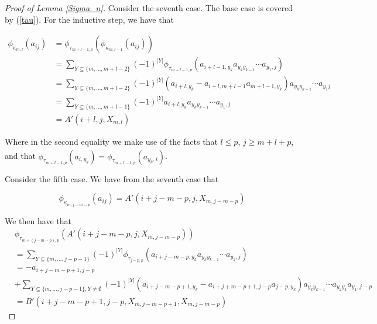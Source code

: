 \documentclass[11pt]{amsart}
\def\t{{\tau}}
\def\k{{\kappa}}
\theoremstyle{definition}
\begin{document}
\begin{proof} [Proof of Lemma \ref{Sigma_n}]
Consider the seventh case.  The base case is covered by (\ref{tau}).  For the inductive step, we have that

\begin{align*}
\phi_{\k_{m,l}}(a_{ij}) &= \phi_{\t_{m+l-1,p}}\left(\phi_{\k_{m,l-1}}(a_{ij})\right)\\
&= \sum_{Y\subseteq \{m,\ldots,m+l-2\}} (-1)^{|Y|} \phi_{\t_{m+l-1,p}}\left(a_{i+l-1,y_k}a_{y_ky_{k-1}}\cdots a_{y_1,j}\right)\\
&= \sum_{Y\subseteq \{m,\ldots,m+l-2\}} (-1)^{|Y|} \left(a_{i+l,y_k} -a_{i+l,m+l-1}a_{m+l-1,y_k}\right)a_{y_ky_{k-1}}\cdots a_{y_1j}\\
&= \sum_{Y\subseteq \{m,\ldots,m+l-1\}} (-1)^{|Y|} a_{i+l,y_k}a_{y_ky_{k-1}}\cdots a_{y_1,j}\\
&= A'(i+l,j,X_{m,l})
\end{align*}

Where in the second equality we make use of the facts that $l\le p$, $j\ge m + l + p$, and that $\phi_{\tau_{m+l-1,p}}(a_{i,y_k}) = \overline{\phi_{\tau_{m+l-1,p}}(a_{y_k,i})}$.

Consider the fifth case.  We have from the seventh case that

$$\phi_{\k_{m,j-m-p}}(a_{ij}) = A'(i+j-m-p,j,X_{m,j-m-p})$$

We then have that
\begin{align*}
&\phi_{\tau_{m + (j-m-p),p}}(A'(i+j-m-p,j,X_{m,j-m-p}))\\
&=\sum_{Y\subseteq \{m,\ldots,j - p - 1\}} (-1)^{|Y|} \phi_{\t_{j-p,p}}\left(a_{i+j-m-p,y_k}a_{y_ky_{k-1}}\cdots a_{y_1,j}\right)\\
&= -a_{i+j-m-p+1,j-p}\\
& + \sum_{Y\subseteq \{m,\ldots,j - p - 1\},Y\ne\emptyset} (-1)^{|Y|} \left(a_{i+j-m-p+1,y_k} -a_{i+j+m-p+1,j-p}a_{j-p,y_k}\right)a_{y_ky_{k-1}}\cdots a_{y_2y_1}a_{y_1,j-p}\\
&= B'(i+j-m-p + 1,j-p,X_{m,j-m-p + 1},X_{m,j-m-p})
\end{align*}


\end{proof}
\end{document}
